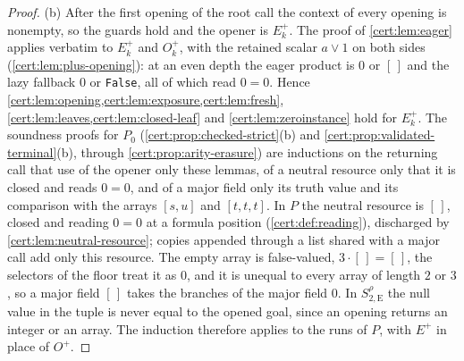 \begin{proof}
(b) After the first opening of the root call the context of every opening is
nonempty, so the guards hold and the opener is $E^{+}_k$. The proof of
\cref{cert:lem:eager} applies verbatim to $E^{+}_k$ and $O^{+}_k$, with the retained
scalar $a\lor 1$ on both sides (\cref{cert:lem:plus-opening}): at an even depth the
eager product is $0$ or $[\,]$ and the lazy fallback $0$ or \texttt{False}, all of
which read $0=0$. Hence \cref{cert:lem:opening,cert:lem:exposure,cert:lem:fresh},
\cref{cert:lem:leaves,cert:lem:closed-leaf} and \cref{cert:lem:zeroinstance} hold
for $E^{+}_k$. The soundness proofs for $P_0$ (\cref{cert:prop:checked-strict}(b)
and \cref{cert:prop:validated-terminal}(b), through \cref{cert:prop:arity-erasure})
are inductions on the returning call that use of the opener only these lemmas, of a
neutral resource only that it is closed and reads $0=0$, and of a major field
only its truth value and its comparison with the arrays $[s,u]$ and $[t,t,t]$. In
$P$ the neutral resource is $[\,]$, closed and reading $0=0$ at a formula position
(\cref{cert:def:reading}), discharged by \cref{cert:lem:neutral-resource}; copies
appended through a list shared with a major call add only this resource. The empty
array is false-valued, $3\cdot[\,]=[\,]$, the selectors of the floor treat it as
$0$, and it is unequal to every array of length $2$ or $3$, so a major field $[\,]$
takes the branches of the major field $0$. In $S^{\rho}_{2,\mathrm E}$ the null
value in the tuple is never equal to the opened goal, since an opening returns an
integer or an array. The induction therefore applies to the runs of $P$, with
$E^{+}$ in place of $O^{+}$.


\end{proof}
